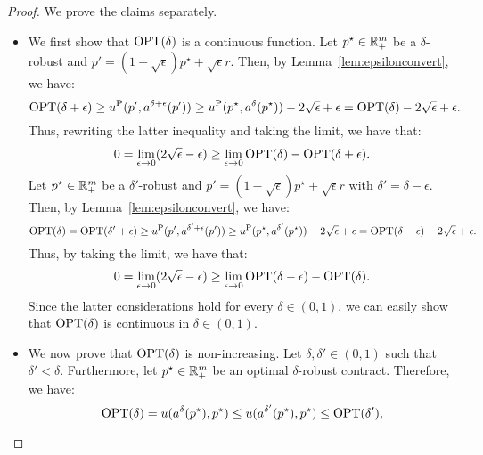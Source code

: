 \begin{proof}
	We prove the claims separately.
	\begin{itemize}
		\item We first show that $\textnormal{OPT}(\delta)$ is a continuous function. 
		Let $p^\star \in \mathbb{R}^{m}_{+}$  be a $\delta$-robust and $p' = (1-\sqrt{\epsilon})p^\star + \sqrt{\epsilon} r$. Then, by Lemma~\ref{lem:epsilonconvert}, we have:
		\begin{equation*}
			\textnormal{OPT}(\delta+\epsilon) \ge u^{\textnormal{P}}(p',a^{\delta+\epsilon}(p')) \ge u^{\textnormal{P}}(p^\star,a^{\delta} (p^\star) ) - 2 \sqrt{\epsilon} + \epsilon = \textnormal{OPT}(\delta) - 2 \sqrt{\epsilon} + \epsilon.
		\end{equation*}
		Thus, rewriting the latter inequality and taking the limit, we have that:
		\begin{equation*}
			0= \lim_{\epsilon \to 0} (2 \sqrt{\epsilon} - \epsilon) \ge \lim_{\epsilon \to 0} \textnormal{OPT}(\delta) - \textnormal{OPT}(\delta+\epsilon).
		\end{equation*} 
		Let $p^\star \in \mathbb{R}^{m}_{+}$  be a $\delta'$-robust and $p' = (1-\sqrt{\epsilon})p^\star + \sqrt{\epsilon} r$ with $\delta'=\delta-\epsilon$. Then, by Lemma~\ref{lem:epsilonconvert}, we have: 
		\begin{equation*}
			\textnormal{OPT}(\delta)= \textnormal{OPT}(\delta'+\epsilon) \ge u^{\textnormal{P}}(p',a^{\delta'+\epsilon}(p')) \ge u^{\textnormal{P}}(p^\star,a^{\delta'} (p^\star) ) - 2 \sqrt{\epsilon} + \epsilon = \textnormal{OPT}(\delta-\epsilon) - 2 \sqrt{\epsilon} + \epsilon.
		\end{equation*}
		Thus, by taking the limit, we have that:
		\begin{equation*}
			0= \lim_{\epsilon \to 0} (2 \sqrt{\epsilon} - \epsilon) \ge \lim_{\epsilon \to 0} \textnormal{OPT}(\delta-\epsilon) - \textnormal{OPT}(\delta).
		\end{equation*} 
		Since the latter considerations hold for every $\delta \in (0,1)$, we can easily show that $\textnormal{OPT}(\delta)$ is continuous in $\delta \in (0,1)$.
		\item We now prove that $\textnormal{OPT}(\delta)$ is non-increasing. 
		Let $\delta,\delta' \in (0,1)$ such that $\delta'<\delta$. Furthermore, let $p^\star \in \mathbb{R}^{m}_{+}$ be an optimal $\delta$-robust contract. Therefore, we have:
		\begin{equation*}
			\textnormal{OPT}(\delta)=u(a^\delta(p^\star), p^\star ) \le u(a^{\delta'}(p^\star), p^\star ) \le \textnormal{OPT}(\delta'),

\end{equation*}
\end{itemize}
\end{proof}
